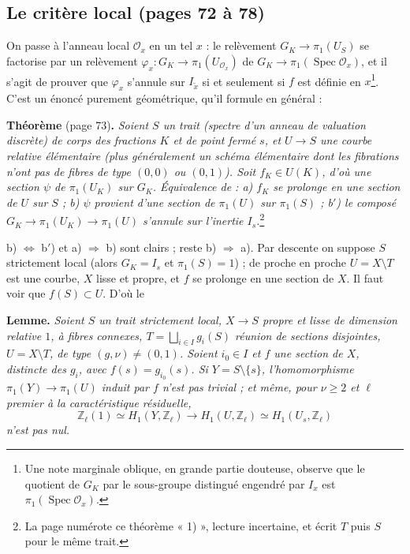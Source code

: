 \documentclass[11pt,a4paper]{article}
\begin{document}
\subsection*{Le critère local (pages 72 à 78)}

On passe à l'anneau local $\mathcal{O}_x$ en un tel $x$ : le relèvement $G_K
\to \pi_1(U_S)$ se factorise par un relèvement $\varphi_x : G_K \to
\pi_1(U_{\mathcal{O}_x})$ de $G_K \to \pi_1(\operatorname{Spec}
\mathcal{O}_x)$, et il s'agit de prouver que $\varphi_x$ s'annule sur
$I_{\tilde x}$ si et seulement si $f$ est définie en $x$\footnote{Une note
marginale oblique, en grande partie douteuse, observe que le quotient de $G_K$
par le sous-groupe distingué engendré par $I_x$ est
$\pi_1(\operatorname{Spec} \mathcal{O}_x)$.}. C'est un énoncé purement
géométrique, qu'il formule en général :

\textbf{Théorème} (page 73)\textbf{.} \emph{Soient $S$ un trait (spectre
d'un anneau de valuation discrète) de corps des fractions $K$ et de point
fermé $s$, et $U \to S$ une courbe relative élémentaire (plus généralement un
schéma élémentaire dont les fibrations n'ont pas de fibres de type $(0,0)$ ou
$(0,1)$). Soit $f_K \in U(K)$, d'où une section $\psi$ de $\pi_1(U_K)$ sur $G_K$.
Équivalence de : a) $f_K$ se prolonge en une section de $U$ sur $S$ ; b)
$\psi$ provient d'une section de $\pi_1(U)$ sur $\pi_1(S)$ ; b$'$) le composé
$G_K \to \pi_1(U_K) \to \pi_1(U)$ s'annule sur l'inertie $I_s$.}\footnote{La
page numérote ce théorème « 1) », lecture incertaine, et écrit $T$ puis $S$
pour le même trait.}

b) $\Leftrightarrow$ b$'$) et a) $\Rightarrow$ b) sont clairs ; reste b)
$\Rightarrow$ a). Par descente on suppose $S$ strictement local (alors $G_K =
I_s$ et $\pi_1(S) = 1$) ; de proche en proche $U = X \setminus T$ est une
courbe, $X$ lisse et propre, et $f$ se prolonge en une section de $X$. Il faut
voir que $f(S) \subset U$. D'où le

\textbf{Lemme.} \emph{Soient $S$ un trait strictement local, $X \to S$ propre et
lisse de dimension relative $1$, à fibres connexes, $T = \bigsqcup_{i \in I}
g_i(S)$ réunion de sections disjointes, $U = X \setminus T$, de type $(g,
\nu) \ne (0,1)$. Soient $i_0 \in I$ et $f$ une section de $X$, distincte des
$g_i$, avec $f(s) = g_{i_0}(s)$. Si $Y = S \setminus \{s\}$, l'homomorphisme
$\pi_1(Y) \to \pi_1(U)$ induit par $f$ n'est pas trivial ; et même, pour $\nu
\ge 2$ et $\ell$ premier à la caractéristique résiduelle,}
\[
\mathbb{Z}_\ell(1) \simeq H_1(Y, \mathbb{Z}_\ell) \longrightarrow H_1(U,
\mathbb{Z}_\ell) \simeq H_1(U_s, \mathbb{Z}_\ell)
\]
\emph{n'est pas nul.}
\end{document}
